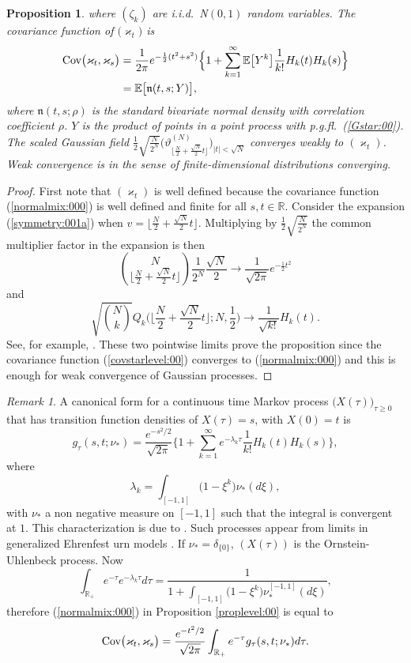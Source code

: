 \documentclass[preprint,11pt]{elsarticle}
\newtheorem{Proposition}{Proposition}
\theoremstyle{remark}
\newtheorem{Remark}{Remark}
\def\spin{{[-1,1]}}
\def\pgfl{\emph{p.g.fl.~}}
\def\iid{\emph{i.i.d.}~}
\begin{document}
{\begin{Proposition}
where $(\zeta_k)$ are \iid N$(0,1)$ random variables.
The covariance function of $\big (\varkappa_t\big )$ is
\begin{align}
\text{\rm Cov}\big (\varkappa_t, \varkappa_s\big )
&= \frac{1}{2\pi}e^{-\frac{1}{2}(t^2+s^2)}
 \Big \{ 1 + \sum_{k=1}^\infty
\mathbb{E}\big [Y^k\big ]\frac{1}{k!}H_k(t)H_k(s)\Big \}\nonumber\\
&=\mathbb{E}\big [\mathfrak{n}(t,s;Y)\big ],
\label{normalmix:000}
\end{align}
where $\mathfrak{n}(t,s;\rho)$ is the standard bivariate normal density with correlation coefficient $\rho$. $Y$ is the product of points in a point process with \pgfl  (\ref{Gstar:00}).
The scaled Gaussian field  $
\frac{1}{2}\sqrt{\frac{N}{2^N}}\Big (\vartheta^{(N)}_{\lfloor \frac{N}{2}+ \frac{\sqrt{N}}{2}t\rfloor }\Big )_{\lvert t \rvert < \sqrt{N}}$ converges weakly to $(\varkappa_t)$.
Weak convergence is in the sense of finite-dimensional distributions converging.
\end{Proposition}
\begin{proof}
First note that $(\varkappa_t)$ is well defined because the covariance function (\ref{normalmix:000}) is well defined and finite for all $s,t\in \mathbb{R}$.
Consider the expansion (\ref{symmetry:001a}) when $v = \lfloor \frac{N}{2}+ \frac{\sqrt{N}}{2}t\rfloor$.
Multiplying by $\frac{1}{2}\sqrt{\frac{N}{2^N}}$ the common multiplier factor in the expansion is then
\[
{N \choose  \lfloor \frac{N}{2}+ \frac{\sqrt{N}}{2}t\rfloor} \frac{1}{2^N}\frac{\sqrt{N}}{2}
\to \frac{1}{\sqrt{2\pi}}e^{-\frac{1}{2}t^2}
\]
and
\[
\sqrt{{N\choose k}}Q_k\Big (\big \lfloor \frac{N}{2}+ \frac{\sqrt{N}}{2}t\big \rfloor ;N,\frac{1}{2}\Big ) \to \frac{1}{\sqrt{k!}}H_k(t).
\]
See, for example, \cite{DG2012}.
These two pointwise limits prove the proposition since the covariance function (\ref{covstarlevel:00}) converges to (\ref{normalmix:000}) and this is enough for weak convergence of Gaussian processes.
\end{proof}
\begin{Remark}
A canonical form for a continuous time Markov process $\big (X(\tau)\big )_{\tau \geq 0}$
that has transition function densities of $X(\tau)=s$, with $X(0)=t$ is
\begin{equation*}
g_\tau(s,t;\nu_*)=\frac{e^{-s^2/2}}{\sqrt{2\pi}}
\Big \{1 + \sum_{k=1}^\infty e^{-\lambda_k\tau}
\frac{1}{k!}H_k(t)H_k(s)\Big \},
\label{canonical:32}
\end{equation*}
where 
\[
\lambda_k = \int_{[-1,1]}\big ( 1 - \xi^k \big )\nu_*(d\xi),
\]
with $\nu_*$ a non negative measure on $\spin$ such that the integral is convergent at $1$. This characterization is due to \cite{B1954}. Such processes appear from limits in generalized Ehrenfest urn models \citep{DG2012}. If $\nu_*=\delta_{\{0\}}$, $(X(\tau))$ is the Ornstein-Uhlenbeck process. 
Now
\[
\int_{\mathbb{R}_+} e^{-\tau } e^{-\lambda_k \tau}d\tau
= \frac{1}{1+\int_{[-1,1]}\big (1 - \xi^k\big )\nu_*^\spin(d\xi)},
\]
therefore (\ref{normalmix:000}) in Proposition \ref{proplevel:00} is equal to
\[
\text{\rm Cov}\big (\varkappa_t, \varkappa_s\big )=\frac{e^{-t^2/2}}{\sqrt{2\pi}}
\int_{\mathbb{R}_+} e^{-\tau} g_\tau(s,t;\nu_*)d\tau.
\]
\end{Remark}
%

}
\end{document}
